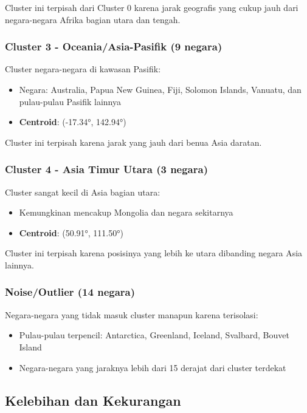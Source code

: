 \documentclass[12pt,a4paper]{article}
\begin{document}
Cluster ini terpisah dari Cluster 0 karena jarak geografis yang cukup jauh dari negara-negara Afrika bagian utara dan tengah.

\subsubsection{Cluster 3 - Oceania/Asia-Pasifik (9 negara)}
Cluster negara-negara di kawasan Pasifik:
\begin{itemize}
    \item Negara: Australia, Papua New Guinea, Fiji, Solomon Islands, Vanuatu, dan pulau-pulau Pasifik lainnya
    \item \textbf{Centroid}: (-17.34°, 142.94°)
\end{itemize}

Cluster ini terpisah karena jarak yang jauh dari benua Asia daratan.

\subsubsection{Cluster 4 - Asia Timur Utara (3 negara)}
Cluster sangat kecil di Asia bagian utara:
\begin{itemize}
    \item Kemungkinan mencakup Mongolia dan negara sekitarnya
    \item \textbf{Centroid}: (50.91°, 111.50°)
\end{itemize}

Cluster ini terpisah karena posisinya yang lebih ke utara dibanding negara Asia lainnya.

\subsubsection{Noise/Outlier (14 negara)}
Negara-negara yang tidak masuk cluster manapun karena terisolasi:
\begin{itemize}
    \item Pulau-pulau terpencil: Antarctica, Greenland, Iceland, Svalbard, Bouvet Island
    \item Negara-negara yang jaraknya lebih dari 15 derajat dari cluster terdekat
\end{itemize}

\subsection{Kelebihan dan Kekurangan}
\end{document}
